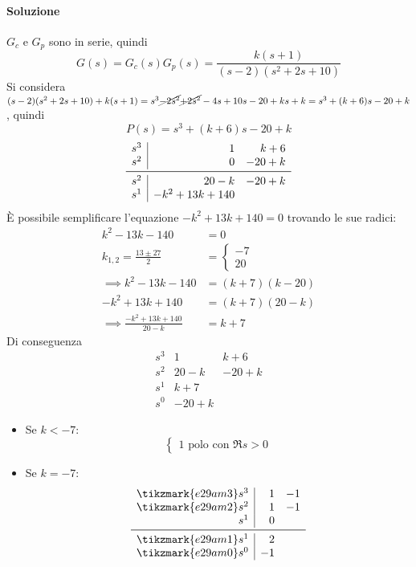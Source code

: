\begin{esercizio}
\paragraph{Soluzione}
\(G_c\) e \(G_p\) sono in serie, quindi
\[
	G(s) = G_c(s)G_p(s) = \frac{k(s+1)}{(s-2)(s^2 + 2s + 10)}
\]
Si considera \((s-2)(s^2+2s+10)+k(s+1) = s^3 \cancel{-2s^2} \cancel{+2s^2} -4s +10s -20 +ks +k = s^3 +(k+6)s -20+k\),
quindi \[P(s) = s^3 +(k+6)s -20+k\]
\[\begin{array}{r|rr}
	s^3 & 1 & k+6 \\
	s^2 & 0 & -20+k \\
	\midrule
	s^2 & 20-k & -20+k \\
	s^1 & -k^2+13k+140
\end{array}\]
È possibile semplificare l'equazione \(-k^2 +13k +140 = 0\) trovando le sue radici:
\begin{align*}
	k^2 -13k -140 &= 0 \\
	k_{1,2} = \frac{13 \pm27}{2} &= \begin{cases} -7 \\ 20 \end{cases} \\
	\implies k^2 -13k -140 &= (k +7) (k -20) \\
	-k^2 +13k +140 &= (k +7) (20 -k) \\
	\implies \frac{-k^2 +13k +140}{20 -k} &= k+7
\end{align*}
Di conseguenza
\[\begin{array}{r|rr}
	s^3 &    1 &   k+6 \\
	s^2 & 20-k & -20+k \\
	s^1 &  k+7 	   \\
	s^0 & -20+k
\end{array}\]
\begin{itemize}
	\item Se \(k < -7\):
		\[\begin{cases}
			1 \text{ polo con } \Re s > 0
		\end{cases}\]
	\item Se \(k = -7\):
		\[\begin{array}{r|rr}
			\tikzmark{e29am3} s^3 &  1 & -1 \\
			\tikzmark{e29am2} s^2 &  1 & -1 \\
					  s^1 &  0	\\
			\midrule
			\tikzmark{e29am1} s^1 &  2	\\
			\tikzmark{e29am0} s^0 & -1
		\end{array}\]
		\begin{tikzpicture}[overlay, remember picture, yshift=.25\baselineskip, shorten >=.5pt, shorten <=.5pt]

\end{tikzpicture}
\end{itemize}
\end{esercizio}
